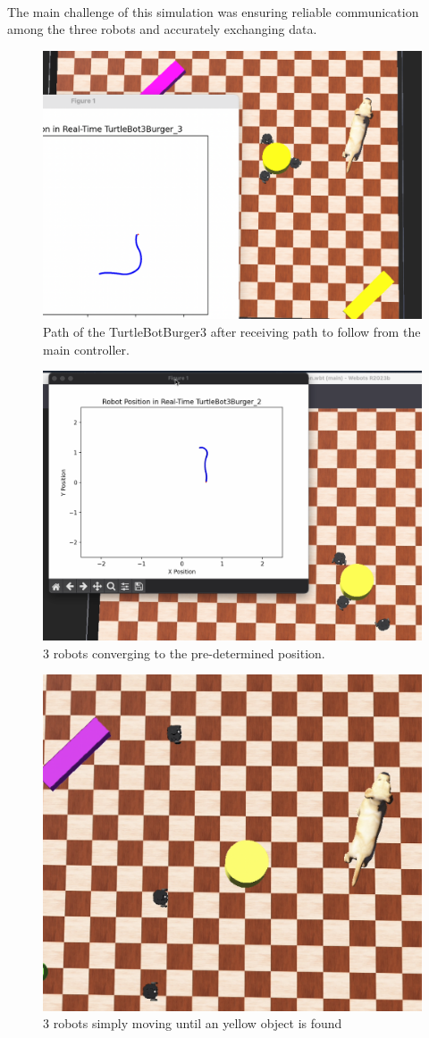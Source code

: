 \paragraph*{}
The main challenge of this simulation was ensuring reliable communication among the three robots and accurately exchanging data.

\begin{figure}
    \centering
    \includegraphics[width=0.5\linewidth]{assets/images/simulation_overview/sim_1.png}
    \caption{Path of the TurtleBotBurger3 after receiving path to follow from the main controller.}
    \label{fig:simulation_overview1} 
\end{figure}

\begin{figure}
    \centering
    \includegraphics[width=0.5\linewidth]{assets/images/simulation_overview/sim_2.png}
    \caption{3 robots converging to the pre-determined position.}
    \label{fig:simulation_overview2}
\end{figure}

\begin{figure}
    \centering
    \includegraphics[width=0.5\linewidth]{assets/images/simulation_overview/sim_3.png}
    \caption{3 robots simply moving until an yellow object is found}
    \label{simulation_overview3}
\end{figure}
